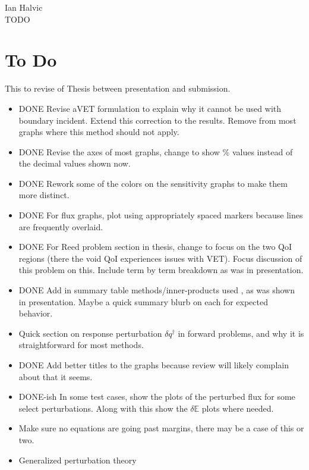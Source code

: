 \documentclass{article}
\newcommand{\Edd}{\mathbb{E}}
\begin{document}
\begin{center}
Ian Halvic \\
TODO\\
\end{center}

\section{To Do}
This to revise of Thesis between presentation and submission.
\begin{itemize}
\item DONE Revise aVET formulation to explain why it cannot be used with boundary incident. Extend this correction to the results. Remove from most graphs where this method should not apply. 
\item DONE Revise the axes of most graphs, change to show $\%$ values instead of the decimal values shown now.
\item DONE Rework some of the colors on the sensitivity graphs to make them more distinct.
\item DONE For flux graphs, plot using appropriately spaced markers because lines are frequently overlaid.
\item DONE For Reed problem section in thesis, change to focus on the two QoI regions (there the void QoI experiences issues with VET). Focus discussion of this problem on this. Include term by term breakdown as was in presentation.
\item DONE Add in summary table methods/inner-products used , as was shown in presentation. Maybe a quick summary blurb on each for expected behavior.
\item Quick section on response perturbation $\delta q^\dag$ in forward problems, and why it is straightforward for most methods.
\item DONE Add better titles to the graphs because review will likely complain about that it seems.
\item DONE-ish In some test cases, show the plots of the perturbed flux for some select perturbations. Along with this show the $\delta \Edd$ plots where needed.
\item Make sure no equations are going past margins, there may be a case of this or two. 
\item Generalized perturbation theory
\end{itemize}
\end{document}
